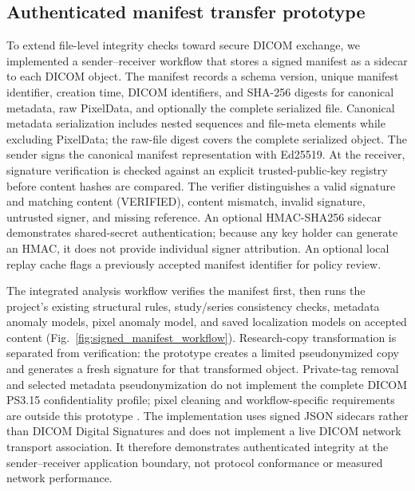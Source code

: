 \documentclass[journal]{IEEEtran}
\begin{document}
  \subsection{Authenticated manifest transfer prototype}
  To extend file-level integrity checks toward secure DICOM exchange, we implemented a sender--receiver workflow that stores a signed manifest as a sidecar to each DICOM object. The manifest records a schema version, unique manifest identifier, creation time, DICOM identifiers, and SHA-256 digests for canonical metadata, raw PixelData, and optionally the complete serialized file. Canonical metadata serialization includes nested sequences and file-meta elements while excluding PixelData; the raw-file digest covers the complete serialized object. The sender signs the canonical manifest representation with Ed25519. At the receiver, signature verification is checked against an explicit trusted-public-key registry before content hashes are compared. The verifier distinguishes a valid signature and matching content (VERIFIED), content mismatch, invalid signature, untrusted signer, and missing reference. An optional HMAC-SHA256 sidecar demonstrates shared-secret authentication; because any key holder can generate an HMAC, it does not provide individual signer attribution. An optional local replay cache flags a previously accepted manifest identifier for policy review.

  The integrated analysis workflow verifies the manifest first, then runs the project's existing structural rules, study/series consistency checks, metadata anomaly models, pixel anomaly model, and saved localization models on accepted content (Fig.~\ref{fig:signed_manifest_workflow}). Research-copy transformation is separated from verification: the prototype creates a limited pseudonymized copy and generates a fresh signature for that transformed object. Private-tag removal and selected metadata pseudonymization do not implement the complete DICOM PS3.15 confidentiality profile; pixel cleaning and workflow-specific requirements are outside this prototype \cite{dicomps315}. The implementation uses signed JSON sidecars rather than DICOM Digital Signatures and does not implement a live DICOM network transport association. It therefore demonstrates authenticated integrity at the sender--receiver application boundary, not protocol conformance or measured network performance.
\end{document}
